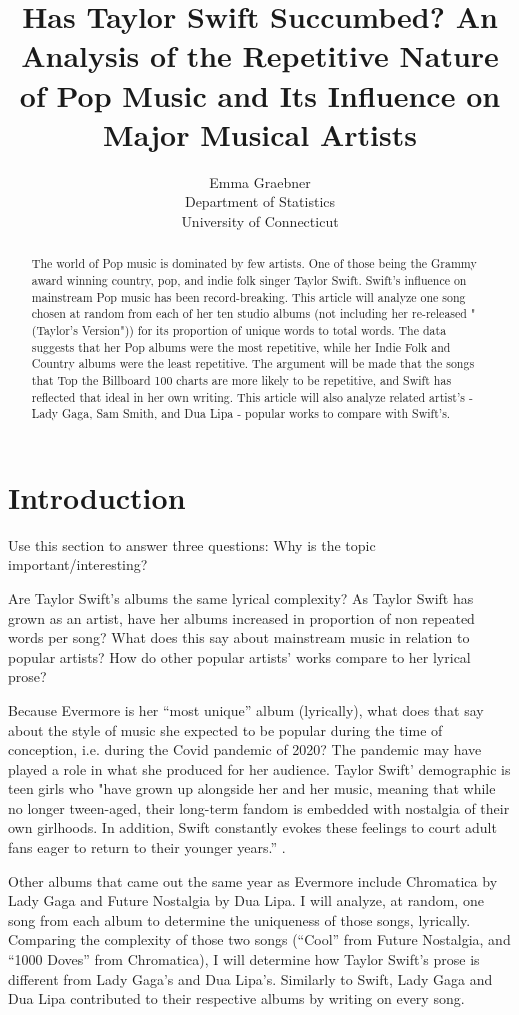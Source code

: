 \documentclass[12pt]{article}
\title{Has Taylor Swift Succumbed? An Analysis of the Repetitive Nature of Pop Music and Its Influence on Major Musical Artists}
\author{Emma Graebner\\
  Department of Statistics\\
  University of Connecticut
}
\begin{document}
\maketitle

\begin{abstract}
The world of Pop music is dominated by few artists. One of those being the Grammy award winning country, pop, and indie folk singer Taylor Swift. Swift's influence on mainstream Pop music has been record-breaking. This article will analyze one song chosen at random from each of her ten studio albums (not including her re-released "(Taylor's Version")) for its proportion of unique words to total words. The data suggests that her Pop albums were the most repetitive, while her Indie Folk and Country albums were the least repetitive. The argument will be made that the songs that Top the Billboard 100 charts are more likely to be repetitive, and Swift has reflected that ideal in her own writing. This article will also analyze related artist's - Lady Gaga, Sam Smith, and Dua Lipa - popular works to compare with Swift's.   
\end{abstract}


\section{Introduction}
\label{sec:intro}

Use this section to answer three questions:
Why is the topic important/interesting?

Are Taylor Swift’s albums the same lyrical complexity? As Taylor Swift has grown as an artist, have her albums increased in proportion of non repeated words per song? What does this say about mainstream music in relation to popular artists? How do other popular artists’ works compare to her lyrical prose? 

	Because Evermore is her “most unique” album (lyrically), what does that say about the style of music she expected to be popular during the time of conception, i.e. during the Covid pandemic of 2020? The pandemic may have played a role in what she produced for her audience. Taylor Swift' demographic is teen girls who "have grown up alongside her and her music, meaning that while no longer tween-aged, their long-term fandom is embedded with nostalgia of their own girlhoods. In addition, Swift constantly evokes these feelings to court adult fans eager to return to their younger years.” \citep{rossman2022taylor}. 
	
	Other albums that came out the same year as Evermore include Chromatica by Lady Gaga and Future Nostalgia by Dua Lipa. I will analyze, at random, one song from each album to determine the uniqueness of those songs, lyrically. Comparing the complexity of those two songs (“Cool” from Future Nostalgia, and “1000 Doves” from Chromatica), I will determine how Taylor Swift’s prose is different from Lady Gaga’s and Dua Lipa’s. Similarly to Swift, Lady Gaga and Dua Lipa contributed to their respective albums by writing on every song. 
	
\end{document}

